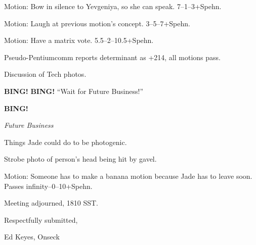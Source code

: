 \documentclass[12pt]{article}
\newcommand{\bing}{{\bf BING!} }
\newcommand{\goto}[1]{\bing \vskip 12pt \centerline{{\em{#1}}}}
\begin{document}
Motion: Bow in silence to Yevgeniya, so she can speak.  7--1--3+Spehn.


Motion: Laugh at previous motion's concept.  3--5--7+Spehn.

Motion: Have a matrix vote.  5.5--2--10.5+Spehn.

Pseudo-Pentiumcomm reports determinant as +214, all motions pass.

Discussion of Tech photos.

\bing \bing ``Wait for Future Business!''

\goto{Future Business}

Things Jade could do to be photogenic.

Strobe photo of person's head being hit by gavel.

Motion: Someone has to make a banana motion because Jade has to leave
soon.  Passes infinity--0--10+Spehn.

\vspace{12pt}

\noindent
Meeting adjourned, 1810 SST.

\vspace{18pt}

\centerline{Respectfully submitted,}
\centerline{Ed Keyes, Onseck}
\end{document}
